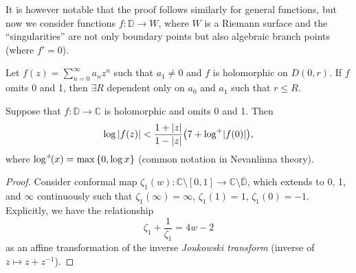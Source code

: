 It is however notable that the proof follows similarly for general functions, but now we consider functions \(f:\mathbb{D}\to W\), where \(W\) is a Riemann surface and the ``singularities'' are not only boundary points but also algebraic branch points (where \(f'=0\)).
\begin{theorem}
    Let \(f(z)=\sum_{n=0}^\infty a_n z^n\) such that \(a_1\neq0\) and \(f\) is holomorphic on \(D(0,r)\). If \(f\) omits 0 and 1, then \(\exists R\) dependent only on \(a_0\) and \(a_1\) such that \(r\leq R\).
\end{theorem}
\begin{theorem}
    Suppose that \(f:\mathbb{D}\to\mathbb{C}\) is holomorphic and omits 0 and 1. Then \[\log\abs{f(z)}<\frac{1+\abs{z}}{1-\abs{z}}\qty(7+\mathop{\log^+\!} \abs{f(0)}),\] where \(\logp (x)=\max\cbraces{0,\log x}\) (common notation in Nevanlinna theory).
\end{theorem}
\begin{proof}
    Consider conformal map \(\zeta_1(w):\mathbb{C}\setminus[0,1]\to\mathbb{C}\setminus\overline{\mathbb{D}}\), which extends to 0, 1, and \(\infty\) continuously such that \(\zeta_1(\infty)=\infty\), \(\zeta_1(1)=1\), \(\zeta_1(0)=-1\). Explicitly, we have the relationship \[\zeta_1+\frac1{\zeta_1}=4w-2\] as an affine transformation of the inverse \textit{Joukowski transform} (inverse of \(z\mapsto z+z^{-1}\)).
\end{proof}
